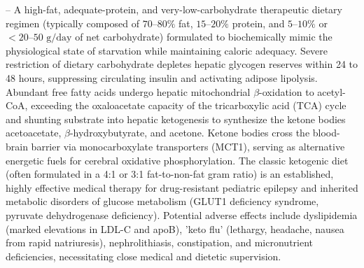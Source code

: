 -- A high-fat, adequate-protein, and very-low-carbohydrate therapeutic dietary regimen (typically composed of $70\text{--}80\%$ fat, $15\text{--}20\%$ protein, and $5\text{--}10\%$ or $<20\text{--}50\text{ g/day}$ of net carbohydrate) formulated to biochemically mimic the physiological state of starvation while maintaining caloric adequacy. Severe restriction of dietary carbohydrate depletes hepatic glycogen reserves within 24 to 48 hours, suppressing circulating insulin and activating adipose lipolysis. Abundant free fatty acids undergo hepatic mitochondrial $\beta$-oxidation to acetyl-CoA, exceeding the oxaloacetate capacity of the tricarboxylic acid (TCA) cycle and shunting substrate into hepatic ketogenesis to synthesize the ketone bodies acetoacetate, $\beta$-hydroxybutyrate, and acetone. Ketone bodies cross the blood-brain barrier via monocarboxylate transporters (MCT1), serving as alternative energetic fuels for cerebral oxidative phosphorylation. The classic ketogenic diet (often formulated in a 4:1 or 3:1 fat-to-non-fat gram ratio) is an established, highly effective medical therapy for drug-resistant pediatric epilepsy and inherited metabolic disorders of glucose metabolism (GLUT1 deficiency syndrome, pyruvate dehydrogenase deficiency). Potential adverse effects include dyslipidemia (marked elevations in LDL-C and apoB), 'keto flu' (lethargy, headache, nausea from rapid natriuresis), nephrolithiasis, constipation, and micronutrient deficiencies, necessitating close medical and dietetic supervision.

